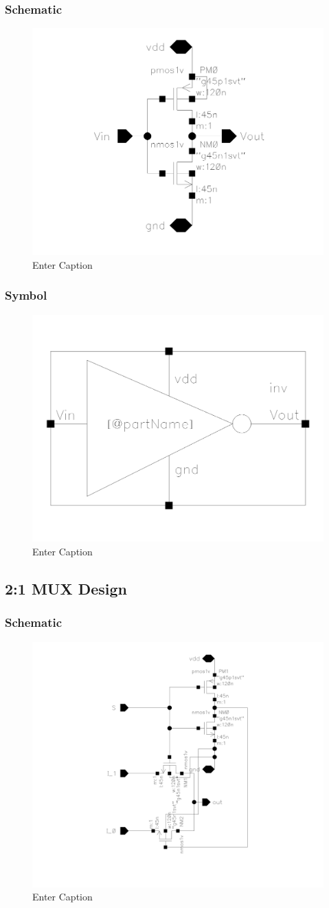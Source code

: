 \documentclass[12pt]{article}
\begin{document}
\subsubsection*{Schematic}

\begin{figure}[H]
    \centering
    \includegraphics[width=0.5\linewidth]{writeup//figures/inv_sch.png}
    \caption{Enter Caption}
\end{figure}

\subsubsection*{Symbol}

\begin{figure}[H]
    \centering
    \includegraphics[width=0.5\linewidth]{writeup//figures/inv_sym.png}
    \caption{Enter Caption}
\end{figure}

\newpage

\subsection{2:1 MUX Design}

\subsubsection*{Schematic}

\begin{figure}[H]
    \centering
    \includegraphics[width=0.5\linewidth]{writeup//figures/MUX_sch.png}
    \caption{Enter Caption}
\end{figure}
\end{document}
